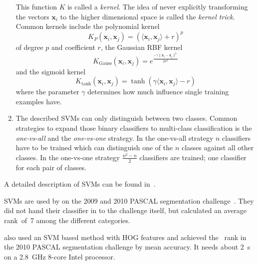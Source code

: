 \begin{enumerate}
          This function $K$ is called a \textit{kernel}. The idea of never
          explicitly transforming the vectors $\mathbf{x}_i$ to the higher
          dimensional space is called the \textit{kernel trick}. Common kernels
          include the polynomial kernel
          \[K_P(\mathbf{x}_i, \mathbf{x}_j) = (\langle \mathbf{x}_i, \mathbf{x}_j \rangle + r)^p\]
          of degree $p$ and coefficient $r$, the Gaussian \gls{RBF} kernel
          \[K_{\text{Gauss}}(\mathbf{x}_i, \mathbf{x}_j) = e^{\frac{-\gamma\|\mathbf{x}_i - \mathbf{x}_j\|^2}{2 \sigma^2}}\]
          and the sigmoid kernel
          \[K_{\text{tanh}}(\mathbf{x}_i, \mathbf{x}_j) = \tanh(\gamma \langle \mathbf{x}_i, \mathbf{x}_j \rangle - r)\]
          where the parameter $\gamma$ determines how much influence single
          training examples have.
    \item The described \glspl{SVM} can only distinguish between two classes.
          Common strategies to expand those binary classifiers to multi-class
          classification is the \textit{one-vs-all} and the \textit{one-vs-one}
          strategy. In the one-vs-all strategy $n$ classifiers have to be
          trained which can distinguish one of the $n$ classes against all
          other classes. In the one-vs-one strategy $\frac{n^2 - n}{2}$
          classifiers are trained; one classifier for each pair of classes.
\end{enumerate}

A detailed description of \glspl{SVM} can be found in~\cite{burges1998tutorial}.

\Glspl{SVM} are used by \cite{yang2012layered} on the 2009 and 2010 PASCAL
segmentation challenge~\cite{everingham2010pascal}. They did not hand their
classifier in to the challenge itself, but calculated an average rank~of~7
among the different categories.

\cite{felzenszwalb2010object} also used an \gls{SVM} based method with \gls{HOG}
features and achieved the ~rank in the 2010 PASCAL segmentation
challenge by mean accuracy. It needs about \SI{2}{\second} on a
\SI{2.8}{\giga\hertz} 8-core Intel processor.
